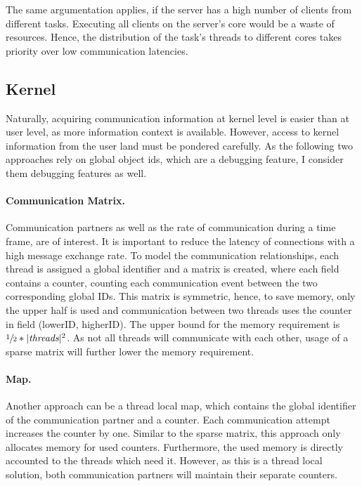 The same argumentation applies, if the server has a high number of clients from
different tasks.
Executing all clients on the server's core would be a waste of resources.
Hence, the distribution of the task's threads to different cores takes priority
over low communication latencies.


\subsection{Kernel}
Naturally, acquiring communication information at kernel level is easier than
at user level, as more information context is available.
However, access to kernel information from the user land must be pondered carefully.
As the following two approaches rely on global object ids, which are a debugging
feature, I consider them debugging features as well.


\paragraph{Communication Matrix.}
Communication partners as well as the rate of communication during a time
frame, are of interest.
It is important to reduce the latency of connections with a high message
exchange rate.
To model the communication relationships, each thread is assigned a global
identifier and a matrix is created, where each field contains a counter,
counting each communication event between the two corresponding global IDs.
This matrix is symmetric, hence, to save memory, only the upper half is used
and communication between two threads uses the counter in field
(lowerID, higherID).
The upper bound for the memory requirement is $\sfrac{1}{2} * |\textit{threads}|^2$.
As not all threads will communicate with each other, usage of a sparse matrix
will further lower the memory requirement.

\paragraph{Map.}
Another approach can be a thread local map, which contains the global
identifier of the communication partner and a counter.
Each communication attempt increases the counter by one.
Similar to the sparse matrix, this approach only allocates memory for used
counters.
Furthermore, the used memory is directly accounted to the threads which need it.
However, as this is a thread local solution, both communication partners will
maintain their separate counters.

